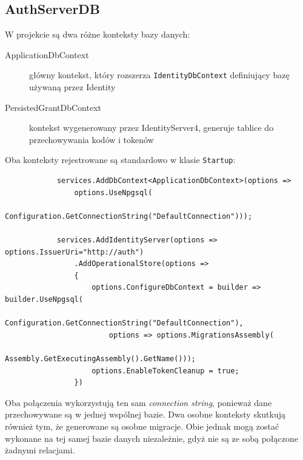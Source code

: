 	\subsection{AuthServerDB}
		W projekcie są dwa różne konteksty bazy danych:
		\begin{description}
			\item[ApplicationDbContext] główny kontekst, który rozszerza \verb|IdentityDbContext| definiujący bazę używaną przez Identity
			\item[PersistedGrantDbContext] kontekst wygenerowany przez IdentityServer4, generuje tablice do przechowywania kodów i tokenów
		\end{description}

		Oba konteksty rejestrowane są standardowo w klasie \verb|Startup|:
		\begin{lstlisting}
			services.AddDbContext<ApplicationDbContext>(options =>
				options.UseNpgsql(
					Configuration.GetConnectionString("DefaultConnection")));

			services.AddIdentityServer(options => options.IssuerUri="http://auth")
				.AddOperationalStore(options =>
				{
					options.ConfigureDbContext = builder => builder.UseNpgsql(
						Configuration.GetConnectionString("DefaultConnection"),
						options => options.MigrationsAssembly(
							Assembly.GetExecutingAssembly().GetName()));
					options.EnableTokenCleanup = true;
				})
		\end{lstlisting}
		Oba połączenia wykorzystują ten sam \emph{connection string}, ponieważ dane przechowywane są w jednej wspólnej bazie.
		Dwa osobne konteksty skutkują również tym, że generowane są osobne migracje.
		Obie jednak mogą zostać wykonane na tej samej bazie danych niezależnie, gdyż nie są ze sobą połączone żadnymi relacjami.

